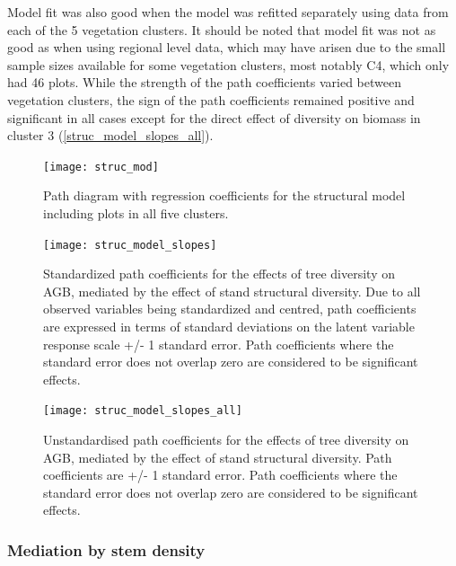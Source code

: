 \documentclass[11pt,a4paper]{article}
\begin{document}
Model fit was also good when the model was refitted separately using data from each of the 5 vegetation clusters. It should be noted that model fit was not as good as when using regional level data, which may have arisen due to the small sample sizes available for some vegetation clusters, most notably C4, which only had 46 plots. While the strength of the path coefficients varied between vegetation clusters, the sign of the path coefficients remained positive and significant in all cases except for the direct effect of diversity on biomass in cluster 3 (\autoref{struc_model_slopes_all}).

\begin{figure}[H]
\centering
	\texttt{[image: struc\_mod]}
	\caption{Path diagram with regression coefficients for the structural model including plots in all five clusters.}
	\label{struc_mod}
\end{figure}

\begin{figure}[H]
\centering
	\texttt{[image: struc\_model\_slopes]}
	\caption{Standardized path coefficients for the effects of tree diversity on AGB, mediated by the effect of stand structural diversity. Due to all observed variables being standardized and centred, path coefficients are expressed in terms of standard deviations on the latent variable response scale +/- 1 standard error. Path coefficients where the standard error does not overlap zero are considered to be significant effects.}
	\label{struc_model_slopes}
\end{figure}

\begin{figure}[H]
\centering
	\texttt{[image: struc\_model\_slopes\_all]}
	\caption{Unstandardised path coefficients for the effects of tree diversity on AGB, mediated by the effect of stand structural diversity. Path coefficients are +/- 1 standard error. Path coefficients where the standard error does not overlap zero are considered to be significant effects.}
	\label{struc_model_slopes_all}
\end{figure}




\subsubsection{Mediation by stem density}
\end{document}
